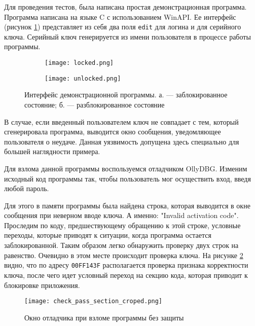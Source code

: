 
Для проведения тестов, была написана простая демонстрационная программа.
Программа написана на языке C с использованием WinAPI. Ее интерфейс (рисунок
\ref{fig:interface}) представляет из себя два поля \verb!edit! для логина и для
серийного ключа. Серийный ключ генерируется из имени пользователя в процессе
работы программы.

\begin{figure}[h!]
  \centering
  \begin{subfigure}[bt]{0.45\textwidth}
    \centering
    \texttt{[image: locked.png]}
    \caption{}
  \end{subfigure}
  \hfill
  \begin{subfigure}[bt]{0.45\textwidth}
    \centering
    \texttt{[image: unlocked.png]}
    \caption{}
  \end{subfigure}
  \caption{Интерфейс демонстрационной программы. а. --- заблокированное
    состояние; б. --- разблокированное состояние}
  \label{fig:interface}
\end{figure}

В случае, если введенный пользователем ключ не совпадает с тем, который
сгенерировала программа, выводится окно сообщения, уведомляющее пользователя о
неудаче. Данная уязвимость допущена здесь специально для большей
наглядности примера.

Для взлома данной программы воспользуемся отладчиком OllyDBG. Изменим исходный
код программы так, чтобы пользователь мог осуществить вход, введя любой пароль.

Для этого в памяти программы была найдена строка, которая выводится в окне
сообщения при неверном вводе ключа. А именно: "Invalid activation code".
Проследим по коду, предшествующему обращению к этой строке, условные переходы,
которые приводят к ситуации, когда программа остается заблокированной. Таким
образом легко обнаружить проверку двух строк на равенство. Очевидно в этом месте
происходит проверка ключа. На рисунке \ref{fig:disas_no_protect} видно, что по
адресу \verb!00FF143F! располагается проверка признака корректности ключа, после
чего идет условный переход на секцию кода, которая приводит к блокировке
приложения.

\begin{figure}[htpb]
  \centering
  \texttt{[image: check\_pass\_section\_croped.png]}
  \caption{Окно отладчика при взломе программы без защиты}
  \label{fig:disas_no_protect}
\end{figure}

